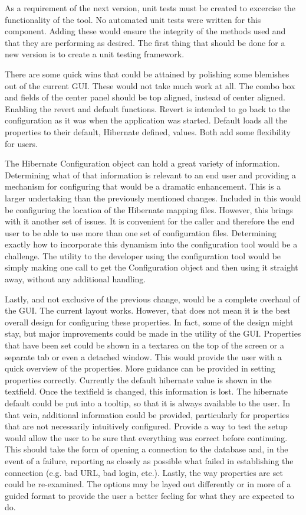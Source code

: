 As a requirement of the next version, unit tests must be created to excercise the functionality of the tool. No automated unit tests were written for this component. Adding these would ensure the integrity of the methods used and that they are performing as desired. The first thing that should be done for a new version is to create a unit testing framework. 

There are some quick wins that could be attained by polishing some blemishes out of the current GUI. These would not take much work at all. The combo box and fields of the center panel should be top aligned, instead of center aligned. Enabling the revert and default functions. Revert is intended to go back to the configuration as it was when the application was started. Default loads all the properties to their default, Hibernate defined, values. Both add some flexibility for users.

The Hibernate Configuration object can hold a great variety of information. Determining what of that information is relevant to an end user and providing a mechanism for configuring that would be a dramatic enhancement. This is a larger undertaking than the previously mentioned changes. Included in this would be configuring the location of the Hibernate mapping files. However, this brings with it another set of issues. It is convenient for the caller and therefore the end user to be able to use more than one set of configuration files. Determining exactly how to incorporate this dynamism into the configuration tool would be a challenge. The utility to the developer using the configuration tool would be simply making one call to get the Configuration object and then using it straight away, without any additional handling.

Lastly, and not exclusive of the previous change, would be a complete overhaul of the GUI. The current layout works. However, that does not mean it is the best overall design for configuring these properties. In fact, some of the design might stay, but major improvements could be made in the utility of the GUI. Properties that have been set could be shown in a textarea on the top of the screen or a separate tab or even a detached window. This would provide the user with a quick overview of the properties. More guidance can be provided in setting properties correctly. Currently the default hibernate value is shown in the textfield. Once the textfield is changed, this information is lost. The hibernate default could be put into a tooltip, so that it is always available to the user. In that vein, additional information could be provided, particularly for properties that are not necessarily intuitively configured. Provide a way to test the setup would allow the user to be sure that everything was correct before continuing. This should take the form of opening a connection to the database and, in the event of a failure, reporting as closely as possible what failed in establishing the connection (e.g. bad URL, bad login, etc.). Lastly, the way properties are set could be re-examined. The options may be layed out differently or in more of a guided format to provide the user a better feeling for what they are expected to do.



